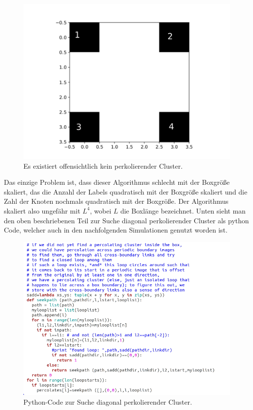 \documentclass[a4paper, 12pt]{scrartcl}
\begin{document}
\begin{figure}[h!]
	\centering
	\includegraphics[scale=0.6]{noperc2.pdf}
	\caption{Es existiert offensichtlich kein perkolierender Cluster.}
\end{figure}

\noindent Das einzige Problem ist, dass dieser Algorithmus schlecht mit der Boxgröße skaliert, das die Anzahl der Labels quadratisch mit der Boxgröße skaliert und die Zahl der Knoten nochmals quadratisch mit der Boxgröße. Der Algorithmus skaliert also ungefähr mit $L^4$, wobei $L$ die Boxlänge bezeichnet. Unten sieht man den oben beschriebenen Teil zur Suche diagonal perkolierender Cluster als python Code, welcher auch in den nachfolgenden Simulationen genutzt worden ist.

\begin{figure}[h!]
	\centering
	\includegraphics[scale=0.9]{diagcode.png}
	\caption{Python-Code zur Suche diagonal perkolierender Cluster.}
\end{figure}
\end{document}
